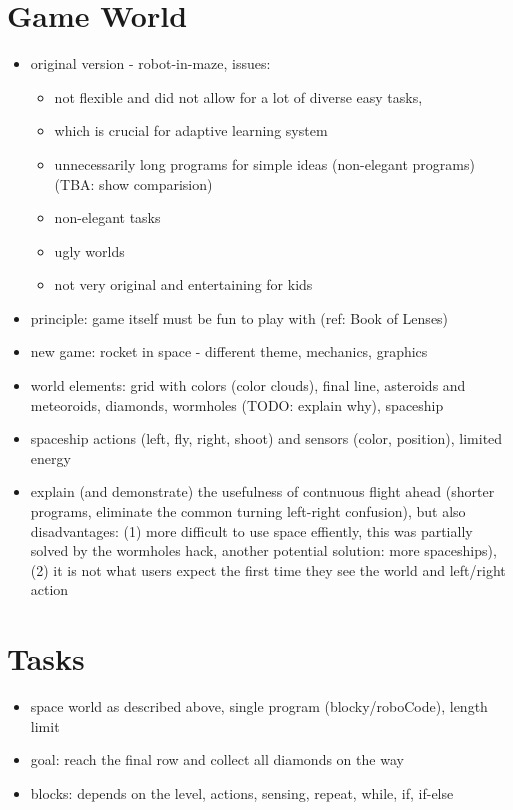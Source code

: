 \section{Game World}
\label{sec:robomission.game-world}

\begin{itemize}
\item original version - robot-in-maze, issues:
  \begin{itemize}
  \item not flexible and did not allow for a lot of diverse easy tasks,
  \item which is crucial for adaptive learning system
  \item unnecessarily long programs for simple ideas (non-elegant programs) (TBA: show comparision)
  \item non-elegant tasks
  \item ugly worlds
  \item not very original and entertaining for kids
  \end{itemize}
\item principle: game itself must be fun to play with (ref: Book of Lenses)
\item new game: rocket in space - different theme, mechanics, graphics
\item world elements: grid with colors (color clouds), final line, asteroids and meteoroids, diamonds, wormholes (TODO: explain why), spaceship
\item spaceship actions (left, fly, right, shoot) and sensors (color, position), limited energy
\item explain (and demonstrate) the usefulness of contnuous flight ahead (shorter programs, eliminate the common turning left-right confusion), but also disadvantages: (1) more difficult to use space effiently, this was partially solved by the wormholes hack, another potential solution: more spaceships), (2) it is not what users expect the first time they see the world and left/right action
\end{itemize}


\section{Tasks}
\label{sec:robomission.tasks}

\begin{itemize}
\item space world as described above, single program (blocky/roboCode), length limit
\item goal: reach the final row and collect all diamonds on the way
\item blocks: depends on the level, actions, sensing, repeat, while, if, if-else
\end{itemize}

